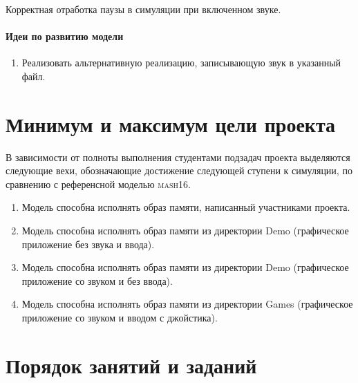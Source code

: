 \todo Корректная отработка паузы в симуляции при включенном звуке.

\paragraph{Идеи по развитию модели}
\begin{enumerate}
\item Реализовать альтернативную реализацию, записывающую звук в указанный файл.                                                                          \end{enumerate}


\section{Минимум и максимум цели проекта}

В зависимости от полноты выполнения студентами подзадач проекта выделяются следующие вехи, обозначающие достижение следующей ступени к симуляции, по сравнению с референсной моделью \textsc{mash16}.

\begin{enumerate}
    \item Модель способна исполнять образ памяти, написанный участниками проекта.
    \item Модель способна исполнять образ памяти из директории Demo (графическое приложение без звука и ввода).
    \item Модель способна исполнять образ памяти из директории Demo (графическое приложение со звуком и без ввода).
    \item Модель способна исполнять образ памяти из директории Games (графическое приложение со звуком и вводом с джойстика).
\end{enumerate}

\section{Порядок занятий и заданий}

